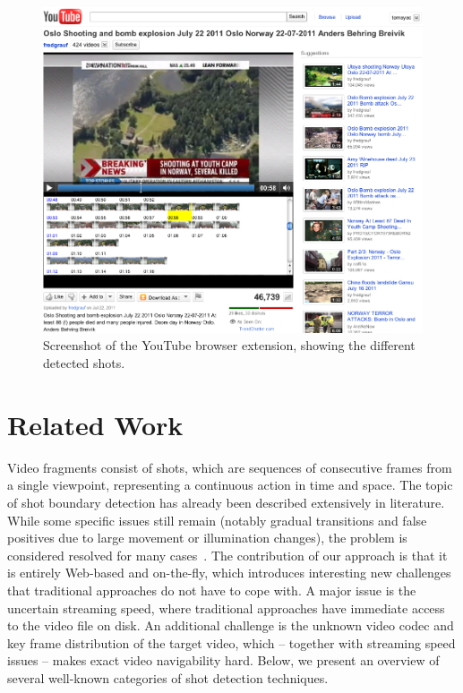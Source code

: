 \documentclass{acm_proc_article-sp}
\begin{document}
\begin{figure}
\begin{center}
   \includegraphics[width=1.0\linewidth]{./resources/screenshot.png}
\end{center}
   \caption{Screenshot of the YouTube browser extension, showing the different detected shots.}
\label{fig:screenshot}
\end{figure}

\section{Related Work} \label{sec:related-work}
Video fragments consist of shots, which are sequences of consecutive frames from a single viewpoint, representing a continuous action in time and space. The topic of shot boundary detection has already been described extensively in literature. While some specific issues still remain (notably gradual transitions and false positives due to large movement or illumination changes), the problem is considered resolved for many cases~\cite{Hanjalic2002, Yuan2007}. The contribution of our approach is that it is entirely Web-based and on-the-fly, which introduces interesting new challenges that traditional approaches do not have to cope with. A major issue is the uncertain streaming speed, where traditional approaches have immediate access to the video file on disk. An additional challenge is the unknown video codec and key frame distribution of the target video, which -- together with streaming speed issues -- makes exact video navigability hard. Below, we present an overview of several well-known categories of shot detection techniques.
\end{document}
